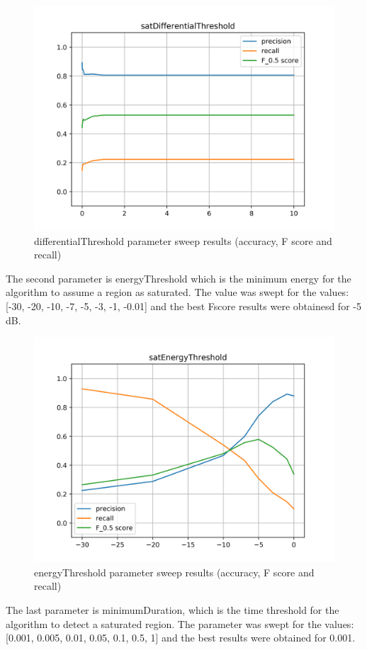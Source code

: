 \begin{figure}[H]
	\includegraphics[clip,width=0.7\columnwidth]{Figures/satDifferentialThreshold.png}%
	\caption{differentialThreshold parameter sweep results (accuracy, F score and recall)}
	\label{fig:satDifferentialThreshold}
\end{figure}

The second parameter is energyThreshold which is the minimum energy for the algorithm to assume a region as saturated. The value was swept for the values: [-30, -20, -10, -7, -5, -3, -1, -0.01] and the best Fscore results were obtainesd for -5 dB.

\begin{figure}[H]
	\includegraphics[clip,width=0.7\columnwidth]{Figures/satEnergyThreshold.png}%
	\caption{energyThreshold parameter sweep results (accuracy, F score and recall)}
	\label{fig:satEnergyThreshold}
\end{figure}

The last parameter is minimumDuration, which is the time threshold for the algorithm to detect a saturated region. The parameter was swept for the values: [0.001, 0.005, 0.01, 0.05, 0.1, 0.5, 1] and the best results were obtained for 0.001.

